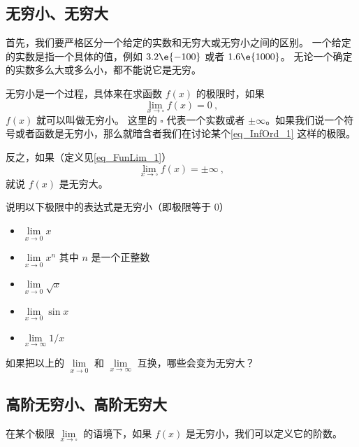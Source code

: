 
\begin{issues}
\issueTODO
\end{issues}


\subsection{无穷小、无穷大}
首先，我们要严格区分一个给定的实数和无穷大或无穷小之间的区别。 一个给定的实数是指一个具体的值，例如 $3.2\e{-100}$ 或者 $1.6\e{1000}$。 无论一个确定的实数多么大或多么小，都不能说它是无穷。

无穷小是一个过程，具体来在求函数 $f(x)$ 的极限时，如果
\begin{equation}\label{eq_InfOrd_1}
\lim_{x\to \square} f(x) = 0~,
\end{equation}
$f(x)$ 就可以叫做无穷小。 这里的 $\square$ 代表一个实数或者 $\pm\infty$。如果我们说一个符号或者函数是无穷小，那么就暗含者我们在讨论某个\autoref{eq_InfOrd_1} 这样的极限。

反之，如果（定义见\autoref{eq_FunLim_1}）
\begin{equation}
\lim_{x\to \square} f(x) = \pm\infty~,
\end{equation}
就说 $f(x)$ 是无穷大。

\begin{exercise}{}
说明以下极限中的表达式是无穷小（即极限等于 0）
\begin{itemize}
\item $\lim\limits_{x\to 0} x$
\item $\lim\limits_{x\to 0} x^n$ 其中 $n$ 是一个正整数
\item $\lim\limits_{x\to 0} \sqrt{x}$
\item $\lim\limits_{x\to 0} \sin x$
\item $\lim\limits_{x\to \infty} 1/x$
\end{itemize}
如果把以上的 $\lim\limits_{x\to 0}$ 和 $\lim\limits_{x\to \infty}$ 互换，哪些会变为无穷大？
\end{exercise}

\subsection{高阶无穷小、高阶无穷大}
在某个极限 $\lim\limits_{x\to \square}$ 的语境下，如果 $f(x)$ 是无穷小，我们可以定义它的阶数。

